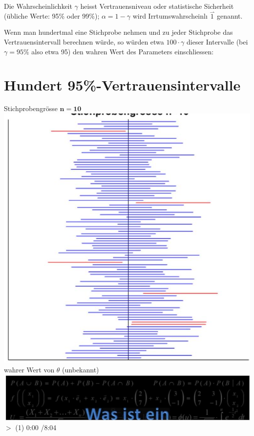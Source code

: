 \documentclass[10pt]{article}
\begin{document}
Die Wahrscheinlichkeit $\gamma$ heisst Vertrauensniveau oder statistische Sicherheit (übliche Werte: 95\% oder 99\%); $\alpha=1-\gamma$ wird Irrtumswahrscheinlı $\stackrel{\rightharpoonup}{1}$ genannt.

Wenn man hundertmal eine Stichprobe nehmen und zu jeder Stichprobe das Vertrauensintervall berechnen würde, so würden etwa $100 \cdot \gamma$ dieser Intervalle (bei $\gamma=95 \%$ also etwa 95) den wahren Wert des Parameters einschliessen:

\section*{Hundert 95\%-Vertrauensintervalle}
 Stichprobengrösse $\mathbf{n = 1 0}$\includegraphics[width=\linewidth]{images/2025_01_02_5f577a434b389b742430g-2(1)}\\
wahrer Wert von $\theta$ (unbekannt)\\
\includegraphics[width=\linewidth]{images/2025_01_02_5f577a434b389b742430g-2}\\
$>$ (1) 0:00 /8:04 $\qquad$
\end{document}
